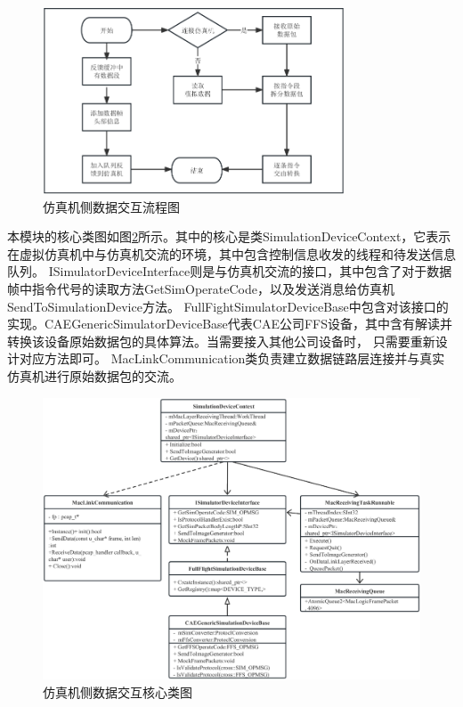 \begin{figure}[h!]
    \begin{center}
        \includegraphics[width=0.8\textwidth]{pictures/flowchart1.pdf}
        \caption{仿真机侧数据交互流程图}
        \label{module11}
    \end{center}
\end{figure}
\par
本模块的核心类图如图\ref{module12}所示。其中的核心是类SimulationDeviceContext，它表示在虚拟仿真机中与仿真机交流的环境，其中包含控制信息收发的线程和待发送信息队列。
ISimulatorDeviceInterface则是与仿真机交流的接口，其中包含了对于数据帧中指令代号的读取方法GetSimOperateCode，以及发送消息给仿真机SendToSimulationDevice方法。
FullFightSimulatorDeviceBase中包含对该接口的实现。CAEGenericSimulatorDeviceBase代表CAE公司FFS设备，其中含有解读并转换该设备原始数据包的具体算法。当需要接入其他公司设备时，
只需要重新设计对应方法即可。
MacLinkCommunication类负责建立数据链路层连接并与真实仿真机进行原始数据包的交流。
\begin{figure}[h!]
    \begin{center}
        \includegraphics[width=\textwidth]{pictures/classdiagram1.pdf}
        \caption{仿真机侧数据交互核心类图}
        \label{module12}
    \end{center}
\end{figure}
